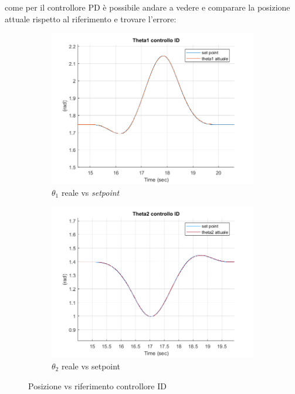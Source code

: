 come per il controllore PD è possibile andare a vedere e comparare la posizione attuale rispetto al riferimento e trovare l'errore:
\begin{figure}[!ht]
\begin{subfigure}{.53\textwidth}
  \centering
  \includegraphics[width=.9\linewidth]{Immagini/Traiettorie/Theta1ID}  
  \caption{$\theta_1$ reale vs \textit{setpoint}}
  \label{fig:sub-id1}
\end{subfigure}
\begin{subfigure}{.53\textwidth}
  \centering
  \includegraphics[width=.9\linewidth]{Immagini/Traiettorie/Theta2ID}  
  \caption{$\theta_2$ reale vs setpoint}
  \label{fig:sub-pd2k}
\end{subfigure}
\caption{Posizione vs riferimento controllore ID}
\end{figure}
